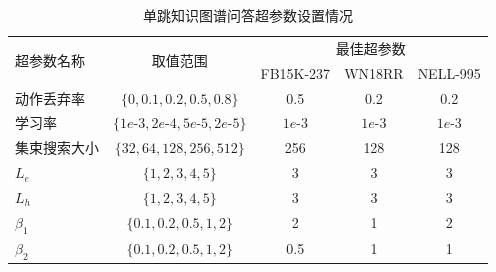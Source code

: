 \documentclass[algorithmlist, AutoFakeBold, AutoFakeSlant, figurelist, tablelist, nomlist, masters]{seuthesix}
\begin{document}
\begin{table}[]
  \centering
  \begin{tabular*}{0.95\textwidth}{@{\extracolsep{\fill}}lcccc}
  \toprule[1pt]
  \multirow{2}{*}{超参数名称} & \multirow{2}{*}{取值范围} & \multicolumn{3}{c}{最佳超参数}\\ 
    &  & FB15K-237 & WN18RR & NELL-995 \\ \hline
  动作丢弃率 & $\{0, 0.1, 0.2, 0.5, 0.8\}$ & 0.5 & 0.2 & 0.2 \\
  学习率 & $\{1e\text{-}3, 2e\text{-}4, 5e\text{-}5, 2e\text{-}5\}$ & $1e\text{-}3$ & $1e\text{-}3$ & $1e\text{-}3$ \\
  集束搜索大小 & $\{32, 64, 128, 256, 512\}$ & 256 & 128 & 128 \\
  $L_e$ & $\{1, 2, 3, 4, 5\}$ & 3 & 3 & 3 \\
  $L_h$ & $\{1, 2, 3, 4, 5\}$ & 3 & 3 & 3 \\
  $\beta_1$ & $\{0.1, 0.2, 0.5, 1, 2\}$ & 2 & 1 & 2 \\
  $\beta_2$ & $\{0.1, 0.2, 0.5, 1, 2\}$ & 0.5 & 1 & 1 \\
  \bottomrule[1pt]
  \end{tabular*}
  \caption{单跳知识图谱问答超参数设置情况}
  \label{Hyperparameters2_Singlehop}
\end{table}
\end{document}
